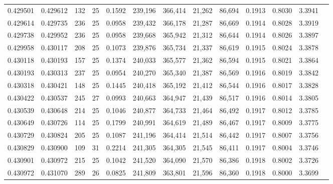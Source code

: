 \begin{tabular}{rrrrrrrrrrrrr}
0.429501 & 0.429612 & 132 &  25 &                                     0.1592 & 239,196 & 366,414 &  21,262 &  86,694 & 0.1913 & 0.8030 & 3.3941 \\
0.429614 & 0.429735 & 236 &  25 &                                     0.0958 & 239,432 & 366,178 &  21,287 &  86,669 & 0.1914 & 0.8028 & 3.3919 \\
0.429738 & 0.429952 & 236 &  25 &                                     0.0958 & 239,668 & 365,942 &  21,312 &  86,644 & 0.1914 & 0.8026 & 3.3897 \\
0.429958 & 0.430117 & 208 &  25 &                                     0.1073 & 239,876 & 365,734 &  21,337 &  86,619 & 0.1915 & 0.8024 & 3.3878 \\
0.430118 & 0.430193 & 157 &  25 &                                     0.1374 & 240,033 & 365,577 &  21,362 &  86,594 & 0.1915 & 0.8021 & 3.3864 \\
0.430193 & 0.430313 & 237 &  25 &                                     0.0954 & 240,270 & 365,340 &  21,387 &  86,569 & 0.1916 & 0.8019 & 3.3842 \\
0.430318 & 0.430421 & 148 &  25 &                                     0.1445 & 240,418 & 365,192 &  21,412 &  86,544 & 0.1916 & 0.8017 & 3.3828 \\
0.430422 & 0.430537 & 245 &  27 &                                     0.0993 & 240,663 & 364,947 &  21,439 &  86,517 & 0.1916 & 0.8014 & 3.3805 \\
0.430539 & 0.430648 & 214 &  25 &                                     0.1046 & 240,877 & 364,733 &  21,464 &  86,492 & 0.1917 & 0.8012 & 3.3785 \\
0.430649 & 0.430726 & 114 &  25 &                                     0.1799 & 240,991 & 364,619 &  21,489 &  86,467 & 0.1917 & 0.8009 & 3.3775 \\
0.430729 & 0.430824 & 205 &  25 &                                     0.1087 & 241,196 & 364,414 &  21,514 &  86,442 & 0.1917 & 0.8007 & 3.3756 \\
0.430829 & 0.430900 & 109 &  31 &                                     0.2214 & 241,305 & 364,305 &  21,545 &  86,411 & 0.1917 & 0.8004 & 3.3746 \\
0.430901 & 0.430972 & 215 &  25 &                                     0.1042 & 241,520 & 364,090 &  21,570 &  86,386 & 0.1918 & 0.8002 & 3.3726 \\
0.430972 & 0.431070 & 289 &  26 &                                     0.0825 & 241,809 & 363,801 &  21,596 &  86,360 & 0.1918 & 0.8000 & 3.3699 \\

\end{tabular}
